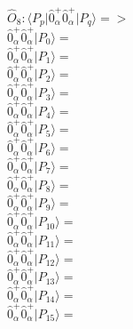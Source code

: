 \documentclass[14pt]{article}
\begin{document}
    $\hat{O}_{8}:  \langle{P_p}\vert \hat{0}_{\alpha}^{+}\hat{0}_{\alpha}^{+} \vert{P_q}\rangle => $ \\ 
    $ \hat{0}_{\alpha}^{+}\hat{0}_{\alpha}^{+} \vert{P_{0}}\rangle =  $ \\ 
    $ \hat{0}_{\alpha}^{+}\hat{0}_{\alpha}^{+} \vert{P_{1}}\rangle =  $ \\ 
    $ \hat{0}_{\alpha}^{+}\hat{0}_{\alpha}^{+} \vert{P_{2}}\rangle =  $ \\ 
    $ \hat{0}_{\alpha}^{+}\hat{0}_{\alpha}^{+} \vert{P_{3}}\rangle =  $ \\ 
    $ \hat{0}_{\alpha}^{+}\hat{0}_{\alpha}^{+} \vert{P_{4}}\rangle =  $ \\ 
    $ \hat{0}_{\alpha}^{+}\hat{0}_{\alpha}^{+} \vert{P_{5}}\rangle =  $ \\ 
    $ \hat{0}_{\alpha}^{+}\hat{0}_{\alpha}^{+} \vert{P_{6}}\rangle =  $ \\ 
    $ \hat{0}_{\alpha}^{+}\hat{0}_{\alpha}^{+} \vert{P_{7}}\rangle =  $ \\ 
    $ \hat{0}_{\alpha}^{+}\hat{0}_{\alpha}^{+} \vert{P_{8}}\rangle =  $ \\ 
    $ \hat{0}_{\alpha}^{+}\hat{0}_{\alpha}^{+} \vert{P_{9}}\rangle =  $ \\ 
    $ \hat{0}_{\alpha}^{+}\hat{0}_{\alpha}^{+} \vert{P_{10}}\rangle =  $ \\ 
    $ \hat{0}_{\alpha}^{+}\hat{0}_{\alpha}^{+} \vert{P_{11}}\rangle =  $ \\ 
    $ \hat{0}_{\alpha}^{+}\hat{0}_{\alpha}^{+} \vert{P_{12}}\rangle =  $ \\ 
    $ \hat{0}_{\alpha}^{+}\hat{0}_{\alpha}^{+} \vert{P_{13}}\rangle =  $ \\ 
    $ \hat{0}_{\alpha}^{+}\hat{0}_{\alpha}^{+} \vert{P_{14}}\rangle =  $ \\ 
    $ \hat{0}_{\alpha}^{+}\hat{0}_{\alpha}^{+} \vert{P_{15}}\rangle =  $ \\ 
    
\end{document}

